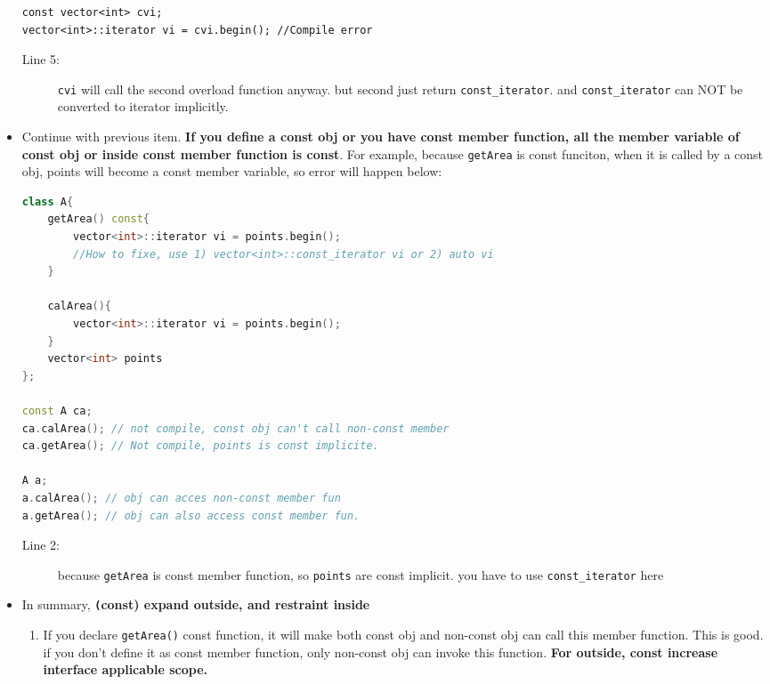 \documentclass[a4paper,11pt,twoside]{book}
\begin{document}
\begin{itemize}
\begin{lstlisting}
const vector<int> cvi;
vector<int>::iterator vi = cvi.begin(); //Compile error
\end{lstlisting}
	\begin{description}
		\item[Line 5:] \texttt{cvi} will call the second overload function anyway. but second just return \texttt{const\_iterator}. and \texttt{const\_iterator} can NOT be converted to iterator implicitly.
	\end{description}
	
	\item Continue with previous item.\textbf{ If you define a const obj or you have const member function, all the member variable of const obj or inside const member function is const}. For example, because \texttt{getArea} is const funciton, when it is called by a const obj, points will become a const member variable, so error will happen below: 
	
\begin{lstlisting}[frame=single, language=c++]
class A{
	getArea() const{
		vector<int>::iterator vi = points.begin(); 
		//How to fixe, use 1) vector<int>::const_iterator vi or 2) auto vi
	}
	
	calArea(){
		vector<int>::iterator vi = points.begin();
	}
	vector<int> points
};

const A ca;
ca.calArea(); // not compile, const obj can't call non-const member	
ca.getArea(); // Not compile, points is const implicite.

A a;
a.calArea(); // obj can acces non-const member fun
a.getArea(); // obj can also access const member fun.
\end{lstlisting}
	
	\begin{description}
		\item[Line 2:] because \texttt{getArea} is const member function, so \texttt{points} are const implicit. you have to use \texttt{const\_iterator} here	
	\end{description}
			
	\item In summary, \textbf{\texttt(const) expand outside, and restraint inside}
	\begin{enumerate}
		\item If you declare \texttt{getArea()} const function, it will make both const obj and non-const obj can call this member function. This is good. if you don't define it as const member function, only non-const obj can invoke this function. \textbf{For outside, const increase interface applicable scope.}
		

\end{enumerate}
\end{itemize}
\end{document}

